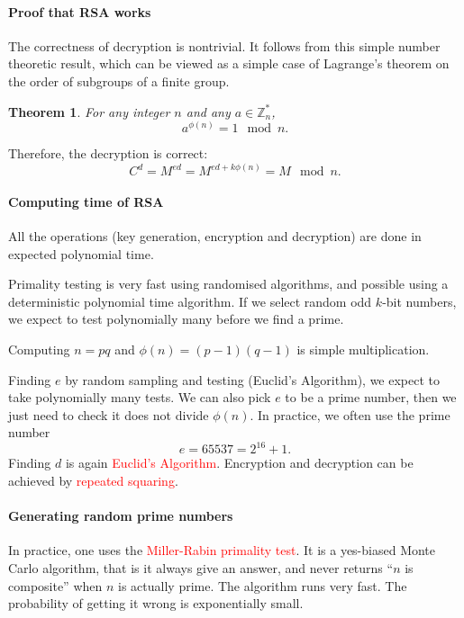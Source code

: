 \documentclass[a4paper, 11pt, openany]{book}
\numberwithin{equation}{section}
\theoremstyle{plain}
\newtheorem{theorem}	[equation]	{Theorem}
\theoremstyle{definition}
\newcommand{\Z}{\mathbb{Z}}
\newcommand{\Important}[1]{\textcolor{red}{#1}}
\begin{document}
\paragraph{Proof that RSA works}
The correctness of decryption is nontrivial. It follows from this simple number theoretic result, which can be viewed as a simple case of Lagrange's theorem on the order of subgroups of a finite group.

\begin{theorem}
For any integer $n$ and any $a \in \Z_n^*$,
\[
    a^{\phi(n)} = 1 \mod n.
\]
\end{theorem}
Therefore, the decryption is correct:
\[
    C^d = M^{ed} = M^{ed + k \phi(n)} = M \mod n.
\]


\paragraph{Computing time of RSA}
All the operations (key generation, encryption and decryption) are done in expected polynomial time.

Primality testing is very fast using randomised algorithms, and possible using a deterministic polynomial time algorithm. If we select random odd $k$-bit numbers, we expect to test polynomially many before we find a prime.

Computing $n = pq$ and $\phi(n) = (p-1)(q-1)$ is simple multiplication.

Finding $e$ by random sampling and testing (Euclid's Algorithm), we expect to take polynomially many tests. We can also pick $e$ to be a prime number, then we just need to check it does not divide $\phi(n)$. In practice, we often use the prime number
\[
    e = 65537 = 2^{16}+1.
\]
Finding $d$ is again \Important{Euclid's Algorithm}. Encryption and decryption can be achieved by \Important{repeated squaring}.



\paragraph{Generating random prime numbers}
In practice, one uses the \Important{Miller-Rabin primality test}. It is a yes-biased Monte Carlo algorithm, that is it always give an answer, and never returns ``$n$ is composite'' when $n$ is actually prime. The algorithm runs very fast. The probability of getting it wrong is exponentially small. 
\end{document}

